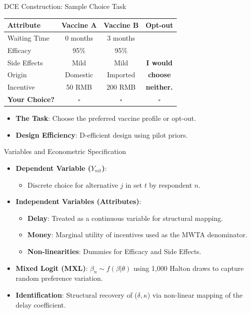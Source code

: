 \documentclass[10pt]{beamer}
\begin{document}
\begin{frame}{DCE Construction: Sample Choice Task}
\begin{table}
\centering
\small
\begin{tabular}{|l|c|c|c|}
\hline
\textbf{Attribute} & \textbf{Vaccine A} & \textbf{Vaccine B} & \textbf{Opt-out} \\
\hline
Waiting Time & 0 months & 3 months & \\
Efficacy & 95\% & 95\% & \\
Side Effects & Mild & Mild & \textbf{I would} \\
Origin & Domestic & Imported & \textbf{choose} \\
Incentive & 50 RMB & 200 RMB & \textbf{neither.} \\
\hline
\textbf{Your Choice?} & $\square$ & $\square$ & $\square$ \\
\hline
\end{tabular}
\end{table}
\begin{itemize}
\item \textbf{The Task}: Choose the preferred vaccine profile or opt-out.
\item \textbf{Design Efficiency}: D-efficient design using pilot priors.
\end{itemize}
\end{frame}

\begin{frame}{Variables and Econometric Specification}
\begin{itemize}
\item \textbf{Dependent Variable ($Y_{nit}$)}:
\begin{itemize}
\item Discrete choice for alternative $j$ in set $t$ by respondent $n$.
\end{itemize}
\item \textbf{Independent Variables (Attributes)}:
\begin{itemize}
\item \textbf{Delay}: Treated as a continuous variable for structural mapping.
\item \textbf{Money}: Marginal utility of incentives used as the MWTA denominator.
\item \textbf{Non-linearities}: Dummies for Efficacy and Side Effects.
\end{itemize}

\item \textbf{Mixed Logit (MXL)}: $\beta_n \sim f(\beta|\theta)$ using 1,000 Halton draws to capture random preference variation.
\item \textbf{Identification}: Structural recovery of ($\delta, \kappa$) via non-linear mapping of the delay coefficient.
\end{itemize}
\end{frame}
\end{document}
